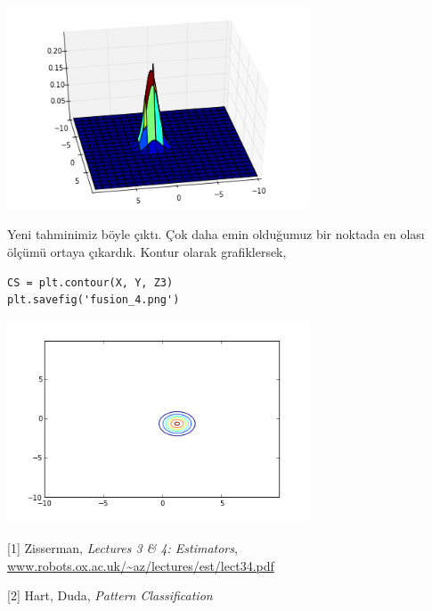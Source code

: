 \documentclass[12pt,fleqn]{article}\usepackage{../../common}
\begin{document}
\includegraphics[height=6cm]{fusion_2.png}

Yeni tahminimiz böyle çıktı. Çok daha emin olduğumuz bir noktada en olası ölçümü
ortaya çıkardık. Kontur olarak grafiklersek,

\begin{verbatim}
CS = plt.contour(X, Y, Z3)
plt.savefig('fusion_4.png')
\end{verbatim}

\includegraphics[height=6cm]{fusion_4.png}


[1] Zisserman, {\em Lectures 3 \& 4: Estimators}, \url{www.robots.ox.ac.uk/~az/lectures/est/lect34.pdf}

[2] Hart, Duda, {\em Pattern Classification}
\end{document}
